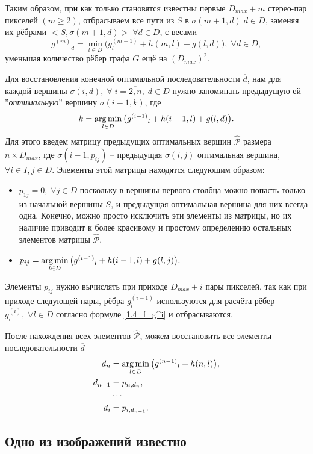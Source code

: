 Таким образом, при как только становятся известны первые $D_{max}+m$ стерео-пар пикселей $( m \geqslant 2)$, отбрасываем все пути из $S$ в 
$\sigma(m+1, d) \; d \in D$, заменяя их рёбрами $<S, \sigma(m+1, d) > \; \forall d \in D$, с весами 
\begin{equation}\label{1.4_f_g^i}
{g^{(m)}}_d = \min\limits_{l \in D}{\big( g^{(m-1)}_l + h(m, l) + g(l, d) \big) },  \; \forall d \in D,
\end{equation}
уменьшая количество рёбер графа $G$ ещё на $(D_{max})^2$.
\newpage

Для восстановления конечной оптимальной последовательности $\overline{d}$, нам для каждой вершины $\sigma(i, d), \; \forall \;	i = \overline{2, n}, \; d \in D$ нужно запоминать предыдущую ей ''\textit{оптимальную}'' вершину $\sigma(i-1, k)$, где 
$$k = \operatorname*{arg\,min}\limits_{l \in D}{\big( {g^{(i-1)}}_l + h(i-1, l) + g(l, d) \big) }.$$
Для этого введем матрицу предыдущих оптимальных вершин $\hat{\mathcal{P}}$ размера \\
$n \times D_{max}$, где $\sigma(i-1, p_{ij}) $ -- предыдущая $\sigma(i, j)$ оптимальная вершина, \\
$\forall i \in I, j \in D$. Элементы этой матрицы находятся следующим образом:
\begin{itemize}
\item $p_{1j} = 0, \; \forall j \in D$ поскольку в вершины первого столбца можно попасть только из начальной вершины $S$, и предыдущая оптимальная вершина для них всегда одна. Конечно, можно просто исключить эти элементы из матрицы, но их наличие приводит к более красивому и простому определению остальных элементов матрицы 
$\hat{\mathcal{P}}$.
\item $p_{ij} = \operatorname*{arg\,min}\limits_{l \in D}{\big( {g^{(i-1)}}_l + h(i-1, l) + g(l, j) \big) }.$
\end{itemize}
Элементы $p_{ij}$ нужно вычислять при приходе $D_{max} + i$ пары пикселей, так как при приходе следующей пары, рёбра $ g^{(i-1)}_l $ используются  
для расчёта рёбер $ g^{(i)}_l, \; \forall l \in D $ согласно формуле \ref{1.4_f_g^i} и отбрасываются.

После нахождения всех элементов $\hat{\mathcal{P}}$, можем восстановить все элементы последовательности $\overline{d}$ ---
\begin{align*}
d_n &= \operatorname*{arg\,min}\limits_{l \in D}  {\big( {g^{(n-1)}}_l + h(n, l) \big) }, \\
d_{n-1} &= p_{n,d_n},\\
&\cdots\\
d_i &= p_{i,d_{n-1}}.
\end{align*}



\subsection{Одно из изображений известно}

























